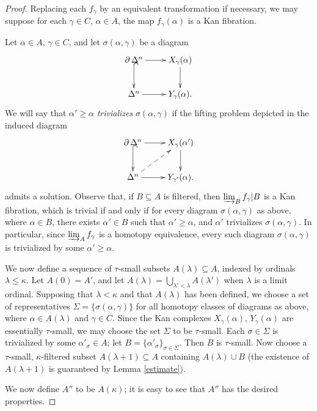 \begin{proof}
Replacing each $f_{\gamma}$ by an equivalent transformation if necessary, we may suppose for each $\gamma \in C$, $\alpha \in A$, the map $f_{\gamma}(\alpha)$ is a Kan fibration.

Let $\alpha \in A$, $\gamma \in C$, and let $\sigma(\alpha,\gamma)$ be a diagram
$$ \xymatrix{ \bd \Delta^n \ar[r] \ar@{^{(}->}[d] & X_{\gamma}(\alpha) \ar[d] \\
\Delta^n \ar[r] & Y_{\gamma}(\alpha). }$$
We will say that $\alpha' \geq \alpha$ {\it trivializes} $\sigma(\alpha,\gamma)$ if the lifting problem
depicted in the induced diagram
$$ \xymatrix{ \bd \Delta^n \ar[r] \ar@{^{(}->}[d] & X_{\gamma}(\alpha') \ar[d] \\
\Delta^n \ar[r] \ar@{-->}[ur] & Y_{\gamma'}(\alpha). }$$
admits a solution. Observe that, if $B \subseteq A$ is filtered, then
$\operatorname{\varinjlim}_{B} f_{\gamma}|B$ is a Kan fibration, which is trivial if and only if
for every diagram $\sigma(\alpha,\gamma)$ as above, where $\alpha \in B$, there
exists $\alpha' \in B$ such that $\alpha' \geq \alpha$, and $\alpha'$ trivializes
$\sigma(\alpha, \gamma)$. In particular, since $\operatorname{\varinjlim}_{A} f_{\gamma}$ is a homotopy equivalence,
every such diagram $\sigma(\alpha,\gamma)$ is trivialized by some $\alpha' \geq \alpha$. 

We now define a sequence of $\tau$-small subsets $A(\lambda) \subseteq A$, indexed by
ordinals $\lambda \leq \kappa$. Let $A(0) = A'$, and let $A(\lambda) = \bigcup_{\lambda' < \lambda} A(\lambda')$ when $\lambda$ is a limit ordinal. Supposing that $\lambda < \kappa$ and that $A(\lambda)$ has been defined, we choose a set of representatives
$\Sigma = \{ \sigma(\alpha, \gamma) \}$ for all homotopy classes of diagrams as above, where
$\alpha \in A(\lambda)$ and $\gamma \in C$. Since the Kan complexes $X_{\gamma}(\alpha)$,
$Y_{\gamma}(\alpha)$ are essentially $\tau$-small, we may choose the set $\Sigma$ to be $\tau$-small. Each $\sigma \in \Sigma$ is trivialized by some $\alpha'_{\sigma} \in A$; let $B = \{ \alpha'_{\sigma} \}_{\sigma \in \Sigma}$. Then $B$ is $\tau$-small. Now choose a $\tau$-small, $\kappa$-filtered subset $A(\lambda+1) \subseteq A$ containing $A(\lambda) \cup B$ (the existence of $A(\lambda+1)$ is guaranteed by Lemma \ref{estimate}).

We now define $A''$ to be $A(\kappa)$; it is easy to see that $A''$ has the desired properties.
\end{proof}

